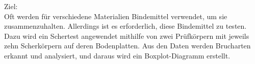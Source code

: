 Ziel:\\
Oft werden für verschiedene Materialien Bindemittel verwendet, um sie zusammenzuhalten. 
Allerdings ist es erforderlich, diese Bindemittel zu testen. 
Dazu wird ein Schertest angewendet mithilfe von zwei Prüfkörpern mit jeweils zehn Scherkörpern auf deren Bodenplatten.
Aus den Daten werden Brucharten erkannt und analysiert, und daraus wird ein Boxplot-Diagramm erstellt.